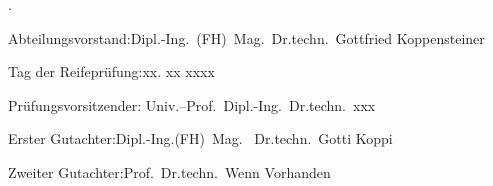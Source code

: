 \begin{titlepage}
	{\color{white}.}
	\bigskip
	\vspace{14cm}
	\noindent%

	Abteilungsvorstand:\hfill Dipl.-Ing.~(FH)\ Mag.\ Dr.techn.\ Gottfried Koppensteiner\\
	\bigskip
	\bigskip

	Tag der Reifeprüfung:\hfill xx. xx xxxx\\
	\bigskip
	\bigskip

	Prüfungsvorsitzender:\hfill
	Univ.--Prof.~Dipl.-Ing.~Dr.techn.~xxx\\
	\smallskip

	Erster Gutachter:\hfill Dipl.-Ing.(FH)\ Mag. \ Dr.techn.\ Gotti Koppi\\
	\smallskip

	Zweiter Gutachter:\hfill 	Prof.\ Dr.techn.\ Wenn Vorhanden\\
		\smallskip
\end{titlepage}
